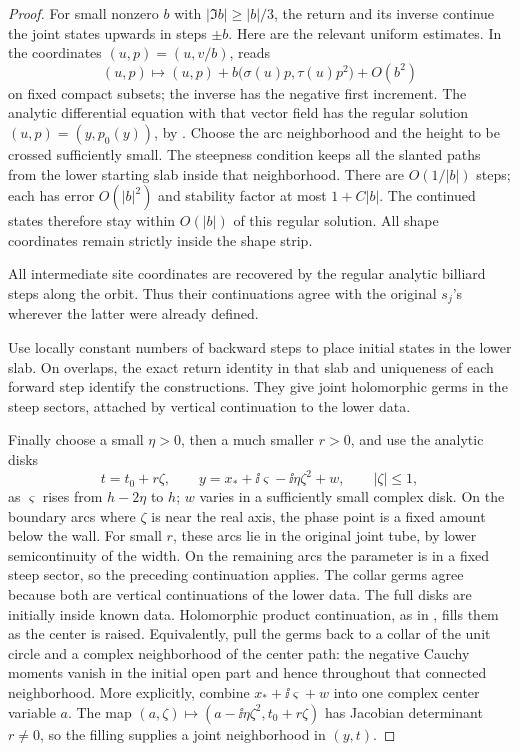 \begin{proof}
For small nonzero \(b\) with \(|\Im b|\ge |b|/3\), the return and its
inverse continue the joint states upwards in steps \(\pm b\).  Here are
the relevant uniform estimates.  In the coordinates \((u,p)=(u,v/b)\),
 reads
\[
 (u,p)\longmapsto(u,p)
       +b\bigl(\sigma(u)p,\tau(u)p^2\bigr)+O(b^2)
\]
on fixed compact subsets; the inverse has the negative first increment.
The analytic differential equation with that vector field has the regular
solution \((u,p)=(y,p_0(y))\), by
.  Choose the arc neighborhood and the
height to be crossed sufficiently small.  The steepness condition keeps
all the slanted paths from the lower starting slab inside that neighborhood.
There are \(O(1/|b|)\) steps; each has error \(O(|b|^2)\) and stability
factor at most \(1+C|b|\).  The continued states therefore stay within
\(O(|b|)\) of this regular solution.  All shape coordinates remain strictly
inside the shape strip.

All intermediate site coordinates are recovered by the regular analytic
billiard steps along the orbit.  Thus their continuations agree with the
original \(s_j\)'s wherever the latter were already defined.

Use locally constant numbers of backward steps to place initial states
in the lower slab.  On overlaps, the exact return identity in that slab
and uniqueness of each forward step identify the constructions.  They
give joint holomorphic germs in the steep sectors, attached by vertical
continuation to the lower data.

Finally choose a small \(\eta>0\), then a much smaller \(r>0\), and use
the analytic disks
\begin{equation}
 t=t_0+r\zeta,\qquad
 y=x_*+\ii\varsigma-\ii\eta\zeta^2+w,
 \qquad |\zeta|\le1,
 \label{odd:contact-disks}
\end{equation}
as \(\varsigma\) rises from \(h-2\eta\) to \(h\); \(w\) varies in a
sufficiently small complex disk.  On the boundary arcs where \(\zeta\)
is near the real axis, the phase point is a fixed amount below the wall.
For small \(r\), these arcs lie in the original joint tube, by lower
semicontinuity of the width.  On the remaining arcs the parameter is in
a fixed steep sector, so the preceding continuation applies.  The collar
germs agree because both are vertical continuations of the lower data.
The full disks are initially inside known data.  Holomorphic product
continuation, as in , fills them as the center
is raised.  Equivalently, pull the germs back to a collar of the unit circle
and a complex neighborhood of the center path: the negative Cauchy moments
vanish in the initial open part and hence throughout that connected
neighborhood. More explicitly, combine \(x_*+\ii\varsigma+w\) into
one complex center variable \(a\). The map
\((a,\zeta)\mapsto(a-\ii\eta\zeta^2,t_0+r\zeta)\)
has Jacobian determinant \(r\ne0\), so the filling supplies a joint
neighborhood in \((y,t)\).


\end{proof}
